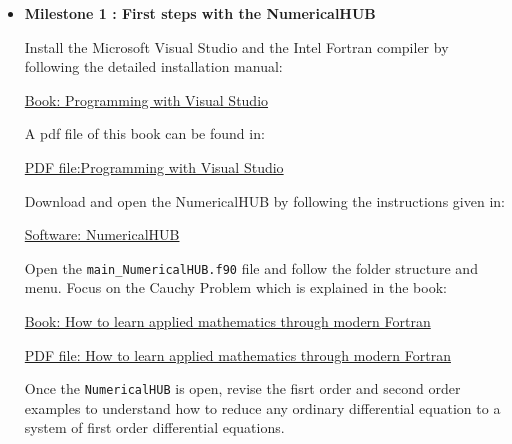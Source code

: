 \documentclass[12pt, a4paper]{article}
\begin{document}
\begin{itemize}
	
	
\vspace{1cm}
\item {\bf Milestone 1 : First steps with the NumericalHUB }



Install the Microsoft Visual Studio and the Intel Fortran compiler by following 
the detailed installation manual:   
  \color{red} 
 \begin{center} 
        \href{https://www.amazon.es/s?k=hernandez+rapado+moreno+visual&__mk_es_ES=AMAZON&ref=nb_sb_noss}
        {Book: Programming with 
          Visual Studio}
  \end{center} 
\color{black}

 
A pdf  file   of this book can be found in: 
\color{red} 
\begin{center}

  \href{https://github.com/jahrWork/Visual-Studio-projects}{PDF 
  file:Programming with 
  Visual Studio}

\end{center}
\color{black}



Download and open the NumericalHUB by following the instructions given in: 
\color{red} 
\begin{center}

  \href{https://github.com/jahrWork/NumericalHUB}{Software: NumericalHUB}

\end{center}
\color{black}                

Open the \texttt{main\_NumericalHUB.f90} file and follow the folder structure 
and menu. Focus on the Cauchy Problem which is explained in the book: 

\color{red} 
\begin{center}
  \href{https://www.amazon.es/s?k=modern+fortran+hernandez&__mk_es_ES=%C3%85M%C3%85%C5%BD%C3%95%C3%91&ref=nb_sb_noss}
  {Book: How to learn applied mathematics through modern Fortran}
  
   \href{https://github.com/jahrWork/NumericalHUB}
    {PDF file: How to learn applied mathematics through modern Fortran}
\end{center}
\color{black}
 
Once the \texttt{NumericalHUB} is open,  revise the fisrt order and second 
order examples to understand how to reduce any ordinary differential equation 
to a system of first order differential equations. 


\end{itemize}
\end{document}
